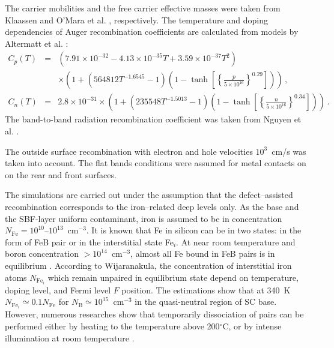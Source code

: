 \documentclass[num-refs]{wiley-article} %
\begin{document}
The carrier mobilities and the free carrier effective masses  were taken from Klaassen \cite{KLAASSEN953}
and O'Mara et al. \cite{OMara}, respectively.
The temperature and doping dependencies of Auger recombination coefficients are calculated from models by Altermatt et al. \cite{Si_Auger}:
\begin{eqnarray}
   \nonumber C_{p} (T)&=& (7.91\times10^{-32}-4.13\times10^{-35}T+3.59\times10^{-37}T^2)\\
  &&\times\left(1+\left(564812T^{-1.6545}-1\right)\left(1-\tanh\left[\left\{\frac{p}{5\times10^{16}}\right\}^{0.29}\right]\right)\right)\,, \\
   C_{n} (T)&=& 2.8\times10^{-31}
  \times\left(1+\left(235548T^{-1.5013}-1\right)\left(1-\tanh\left[\left\{\frac{n}{5\times10^{16}}\right\}^{0.34}\right]\right)\right)\,.
\end{eqnarray}
The band-to-band radiation recombination coefficient was taken from Nguyen et al. \cite{Si_BtB}.

The outside surface recombination with electron and hole velocities $10^3$~cm/s was taken into account.
The flat bands conditions were assumed for metal contacts on on the rear and
front surfaces.

The simulations are carried out under the assumption that the defect–assisted recombination corresponds to the
iron–related deep levels only.
As the base and the SBF-layer uniform contaminant, iron is assumed to be in concentration
$N_{\mathrm{Fe}}=10^{10}$--$10^{13}$~cm$^{-3}$.
It is known that Fe in silicon can be in two states:
in the form of FeB pair or in the interstitial state Fe$_i$.
At near room temperature and boron concentration $>10^{14}$~cm$^{-3}$,
almost all Fe bound in FeB pairs is in equilibrium \cite{FeB:kinetic,FeBAssJAP2014,FeBAssSST2011,FeBJAP2005}.
According to Wijaranakula\cite{FeB:kinetic},
the concentration of interstitial iron atoms $N_{\mathrm{Fe}_i}$ which
remain unpaired in equilibrium state depend on temperature, doping level,
and Fermi level $F$ position.
The estimations show that at 340~K  $N_{\mathrm{Fe}_i}\simeq0.1 N_\mathrm{Fe}$
for $N_\mathrm{B}\simeq10^{15}$~cm$^{-3}$ in the quasi-neutral
region of SC base.
However, numerous researches show that temporarily dissociation of pairs can be performed either by heating to the temperature above 200$^\circ$C,
or by intense illumination at room temperature \cite{FeBAssJAP2014,FeBJAP2005}.
\end{document}

